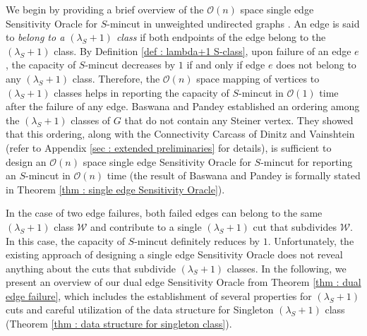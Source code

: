 \documentclass[letterpaper,11pt]{article}
\begin{document}
We begin by providing a brief overview of the ${\mathcal O}(n)$ space single edge Sensitivity Oracle for $S$-mincut in unweighted undirected graphs \cite{DBLP:conf/soda/BaswanaP22}. 
An edge is said to \textit{belong to a $(\lambda_S+1)$ class} if both endpoints of the edge belong to the $(\lambda_S+1)$ class. By Definition \ref{def : lambda+1 S-class}, upon failure of an edge $e$, the capacity of $S$-mincut decreases by $1$ if and only if edge $e$ does not belong to any $(\lambda_S+1)$ class. 
Therefore, the ${\mathcal O}(n)$ space mapping of vertices to $(\lambda_S+1)$ classes helps in reporting the capacity of $S$-mincut in ${\mathcal O}(1)$ time after the failure of any edge. 
Baswana and Pandey \cite{DBLP:conf/soda/BaswanaP22} established an ordering among the $(\lambda_S+1)$ classes of $G$ that do not contain any Steiner vertex. They showed that this ordering, along with the Connectivity Carcass of Dinitz and Vainshtein \cite{DBLP:conf/stoc/DinitzV94, DBLP:conf/soda/DinitzV95, DBLP:journals/siamcomp/DinitzV00} (refer to Appendix \ref{sec : extended preliminaries} for details), is sufficient to design an ${\mathcal O}(n)$ space single edge Sensitivity Oracle for $S$-mincut for reporting an $S$-mincut in ${\mathcal O}(n)$ time (the result of Baswana and Pandey \cite{DBLP:conf/soda/BaswanaP22} is formally stated in Theorem \ref{thm : single edge Sensitivity Oracle}).  

In the case of two edge failures, both failed edges can belong to the same $(\lambda_S+1)$ class ${\mathcal W}$ and contribute to a single $(\lambda_S+1)$ cut that subdivides ${\mathcal W}$. In this case, the capacity of $S$-mincut definitely reduces by $1$. Unfortunately, the existing approach of designing a single edge Sensitivity Oracle does not reveal anything about the cuts that subdivide $(\lambda_S+1)$ classes. 
In the following, we present an overview of our dual edge Sensitivity Oracle from Theorem \ref{thm : dual edge failure}, which includes the establishment of several properties for $(\lambda_S+1)$ cuts and careful utilization of the data structure for Singleton $(\lambda_S+1)$ class (Theorem \ref{thm : data structure for singleton class}).  
\end{document}
